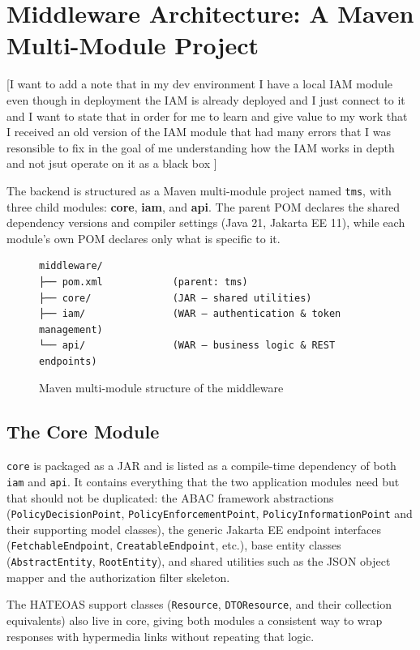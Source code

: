 \section{Middleware Architecture: A Maven Multi-Module Project}
[I want to add a note that in my dev environment I have a local IAM module even though in deployment the IAM is already deployed and I just connect to it
and I want to state that in order for me to learn and  give value to my work that I received an old version of the IAM module
that had many errors that I was resonsible to fix in the goal of me understanding how the IAM works in depth and not jsut operate on it
as a black box ]

The backend is structured as a Maven multi-module project named \texttt{tms}, with three
child modules: \textbf{core}, \textbf{iam}, and \textbf{api}. The parent POM declares the
shared dependency versions and compiler settings (Java 21, Jakarta EE 11), while each
module's own POM declares only what is specific to it.

\begin{figure}[H]
    \centering
\begin{verbatim}
middleware/
├── pom.xml            (parent: tms)
├── core/              (JAR — shared utilities)
├── iam/               (WAR — authentication & token management)
└── api/               (WAR — business logic & REST endpoints)
\end{verbatim}
    \caption{Maven multi-module structure of the middleware}
    \label{fig:maven-structure}
\end{figure}

\subsection{The Core Module}

\texttt{core}
 is packaged as a JAR and is listed as a compile-time dependency of both
\texttt{iam} and \texttt{api}. It contains everything that the two application modules
need but that should not be duplicated: the ABAC framework abstractions
(\texttt{PolicyDecisionPoint}, \texttt{PolicyEnforcementPoint},
\texttt{PolicyInformationPoint} and their supporting model classes), the generic Jakarta EE
endpoint interfaces (\texttt{FetchableEndpoint}, \texttt{CreatableEndpoint}, etc.),
base entity classes (\texttt{AbstractEntity}, \texttt{RootEntity}), and shared utilities
such as the JSON object mapper and the authorization filter skeleton.

The HATEOAS support classes (\texttt{Resource}, \texttt{DTOResource}, and their collection
equivalents) also live in core, giving both modules a consistent way to wrap responses
with hypermedia links without repeating that logic.

